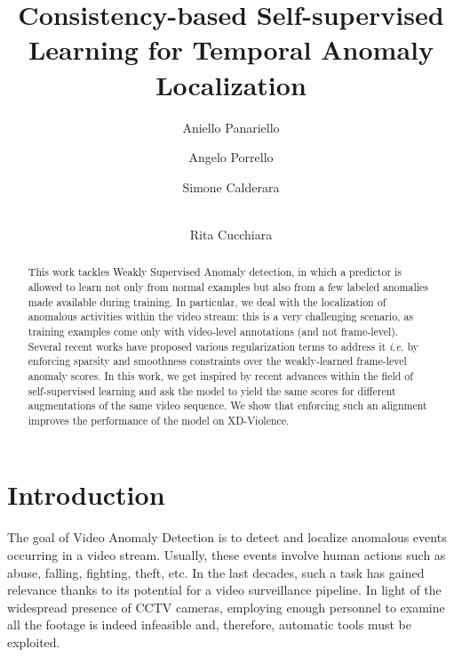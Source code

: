 \documentclass[runningheads]{llncs}
\begin{document}
\pagestyle{headings}
\mainmatter
\def\ECCVSubNumber{27}  

\title{Consistency-based Self-supervised Learning for Temporal Anomaly Localization} 

\begin{comment}
\titlerunning{ECCV-22 submission ID \ECCVSubNumber} 
\authorrunning{ECCV-22 submission ID \ECCVSubNumber} 
\author{Anonymous ECCV submission}
\institute{Paper ID \ECCVSubNumber}
\end{comment}


\author{Aniello Panariello \and
Angelo Porrello \and
Simone Calderara \and\\
Rita Cucchiara }
\maketitle


\begin{abstract}
This work tackles Weakly Supervised Anomaly detection, in which a predictor is allowed to learn not only from normal examples but also from a few labeled anomalies made available during training. In particular, we deal with the localization of anomalous activities within the video stream: this is a very challenging scenario, as training examples come only with video-level annotations (and not frame-level). Several recent works have proposed various regularization terms to address it \textit{i.e.} by enforcing sparsity and smoothness constraints over the weakly-learned frame-level anomaly scores. In this work, we get inspired by recent advances within the field of self-supervised learning and ask the model to yield the same scores for different augmentations of the same video sequence. We show that enforcing such an alignment improves the performance of the model on XD-Violence. 

\end{abstract} \section{Introduction}
The goal of Video Anomaly Detection is to detect and localize anomalous events occurring in a video stream. Usually, these events involve human actions such as abuse, falling, fighting, theft, etc. In the last decades, such a task has gained relevance thanks to its potential for a video surveillance pipeline. In light of the widespread presence of CCTV cameras, employing enough personnel to examine all the footage is indeed infeasible and, therefore, automatic tools must be exploited.
\end{document}
